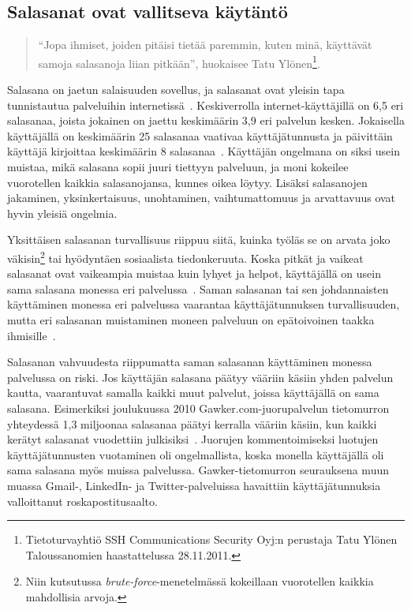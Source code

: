 \documentclass[finnish,gradu]{tktltiki}
\begin{document}
  \subsection{Salasanat ovat vallitseva käytäntö} %
  \label{sub:salasanat}

  \begin{quote}
    ``Jopa ihmiset, joiden pitäisi tietää paremmin, kuten minä, käyttävät samoja salasanoja liian pitkään'', huokaisee Tatu Ylönen\footnote{Tietoturvayhtiö SSH Communications Security Oyj:n perustaja Tatu Ylönen Taloussanomien haastattelussa 28.11.2011.}.
  \end{quote}

  Salasana on jaetun salaisuuden sovellus, ja salasanat ovat yleisin tapa tunnistautua palveluihin internetissä~\cite{study_of_passwords_07, passpet_06, password_management_strategies_06, pwdhash_extension_05}. Keskiverrolla internet-käyttäjillä on 6,5 eri salasanaa, joista jokainen on jaettu keskimäärin 3,9 eri palvelun kesken. Jokaisella käyttäjällä on keskimäärin 25 salasanaa vaativaa käyttäjätunnusta ja päivittäin käyttäjä kirjoittaa keskimäärin 8 salasanaa~\cite{study_of_passwords_07}. Käyttäjän ongelmana on siksi usein muistaa, mikä salasana sopii juuri tiettyyn palveluun, ja moni kokeilee vuorotellen kaikkia salasanojansa, kunnes oikea löytyy. Lisäksi salasanojen jakaminen, yksinkertaisuus, unohtaminen, vaihtumattomuus ja arvattavuus ovat hyvin yleisiä ongelmia.

  Yksittäisen salasanan turvallisuus riippuu siitä, kuinka työläs se on arvata joko väkisin\footnote{Niin kutsutussa \emph{brute-force}-menetelmässä kokeillaan vuorotellen kaikkia mahdollisia arvoja.} tai hyödyntäen sosiaalista tiedonkeruuta. Koska pitkät ja vaikeat salasanat ovat vaikeampia muistaa kuin lyhyet ja helpot, käyttäjällä on usein sama salasana monessa eri palvelussa~\cite{study_of_passwords_07}. Saman salasanan tai sen johdannaisten käyttäminen monessa eri palvelussa vaarantaa käyttäjätunnuksen turvallisuuden, mutta eri salasanan muistaminen moneen palveluun on epätoivoinen taakka ihmisille~\cite{password_management_strategies_06, passpet_06, pw_auth_system_perspective_08, users_are_not_the_enemy_99}.

  Salasanan vahvuudesta riippumatta saman salasanan käyttäminen monessa palvelussa on riski. Jos käyttäjän salasana päätyy vääriin käsiin yhden palvelun kautta, vaarantuvat samalla kaikki muut palvelut, joissa käyttäjällä on sama salasana. Esimerkiksi joulukuussa 2010 Gawker.com-juorupalvelun tietomurron yhteydessä 1,3 miljoonaa salasanaa päätyi kerralla vääriin käsiin, kun kaikki kerätyt salasanat vuodettiin julkisiksi~\cite{bbc_gawker_12_2010, forbes_gawker_12_2010}. Juorujen kommentoimiseksi luotujen käyttäjätunnusten vuotaminen oli ongelmallista, koska monella käyttäjällä oli sama salasana myös muissa palvelussa. Gawker-tietomurron seurauksena muun muassa Gmail-, LinkedIn- ja Twitter-palveluissa havaittiin käyttäjätunnuksia valloittanut roskapostitusaalto.
\end{document}
